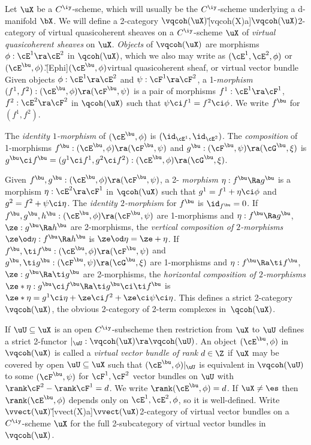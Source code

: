 \documentclass{article}
\begin{document}
\begin{dfn} Let $\uX$ be a $C^\iy$-scheme, which will
usually be the $C^\iy$-scheme underlying a d-manifold $\bX$. We will
define a 2-category
$\vqcoh(\uX)$\G[vqcoh(X)a]{$\vqcoh(\uX)$}{2-category of virtual
quasicoherent sheaves on a $C^\iy$-scheme $\uX$} of {\it virtual
quasicoherent sheaves\/} on $\uX$. {\it Objects\/} of $\vqcoh(\uX)$
are morphisms $\phi:\cE^1\ra\cE^2$ in $\qcoh(\uX)$, which we also
may write as $(\cE^1,\cE^2,\phi)$ or
$(\cE^\bu,\phi)$.\G[Ephi]{$(\cE^\bu,\phi)$}{virtual quasicoherent
sheaf, or virtual vector bundle} Given objects $\phi:\cE^1\ra\cE^2$
and $\psi:\cF^1\ra\cF^2$, a 1-{\it morphism\/}
$(f^1,f^2):(\cE^\bu,\phi)\ra(\cF^\bu,\psi)$ is a pair of morphisms
$f^1:\cE^1\ra\cF^1$, $f^2:\cE^2\ra\cF^2$ in $\qcoh(\uX)$ such that
$\psi\ci f^1=f^2\ci\phi$. We write $f^\bu$
for~$(f^1,f^2)$.

The {\it identity\/ $1$-morphism\/} of $(\cE^\bu,\phi)$ is
$(\id_{\cE^1},\id_{\cE^2})$. The {\it composition\/} of 1-morphisms
$f^\bu:(\cE^\bu,\phi)\ra(\cF^\bu,\psi)$ and
$g^\bu:(\cF^\bu,\psi)\ra(\cG^\bu,\xi)$ is $g^\bu\ci f^\bu=(g^1\ci
f^1,g^2\ci f^2):(\cE^\bu,\phi)\ra(\cG^\bu,\xi)$.

Given $f^\bu,g^\bu:(\cE^\bu,\phi)\ra(\cF^\bu,\psi)$, a 2-{\it
morphism\/} $\eta:f^\bu\Ra g^\bu$ is a morphism $\eta:\cE^2\ra\cF^1$
in $\qcoh(\uX)$ such that $g^1=f^1+\eta\ci\phi$ and
$g^2=f^2+\psi\ci\eta$. The {\it identity\/ $2$-morphism\/} for
$f^\bu$ is $\id_{f^\bu}=0$. If $f^\bu,g^\bu,h^\bu:(\cE^\bu,\phi)\ra
(\cF^\bu,\psi)$ are 1-morphisms and $\eta:f^\bu\Ra g^\bu$,
$\ze:g^\bu\Ra h^\bu$ are 2-morphisms, the {\it vertical composition
of\/ $2$-morphisms\/} $\ze\od\eta:f^\bu\Ra h^\bu$ is
$\ze\od\eta=\ze+\eta$. If $f^\bu,\ti
f{}^\bu:(\cE^\bu,\phi)\ra(\cF^\bu, \psi)$ and $g^\bu,\ti
g{}^\bu:(\cF^\bu,\psi)\ra(\cG^\bu,\xi)$ are 1-morphisms and
$\eta:f^\bu\Ra\ti f{}^\bu$, $\ze:g^\bu\Ra\ti g{}^\bu$ are
2-morphisms, the {\it horizontal composition of\/ $2$-morphisms\/}
$\ze*\eta:g^\bu\ci f^\bu\Ra\ti g{}^\bu\ci\ti f{}^\bu$ is
$\ze*\eta=g^1\ci\eta+\ze\ci f^2+\ze\ci\psi\ci\eta$. This defines a
strict 2-category $\vqcoh(\uX)$, the obvious 2-category of 2-term
complexes in~$\qcoh(\uX)$.

If $\uU\subseteq\uX$ is an open $C^\iy$-subscheme then restriction
from $\uX$ to $\uU$ defines a strict 2-functor
$\vert_\uU:\vqcoh(\uX)\ra\vqcoh(\uU)$. An object $(\cE^\bu,\phi)$ in
$\vqcoh(\uX)$ is called a {\it virtual vector bundle of rank\/}
$d\in\Z$ if $\uX$ may be covered by open $\uU\subseteq\uX$ such that
$(\cE^\bu,\phi)\vert_\uU$ is equivalent in $\vqcoh(\uU)$ to some
$(\cF^\bu,\psi)$ for $\cF^1,\cF^2$ vector bundles on $\uU$ with
$\rank\cF^2-\rank\cF^1=d$. We write $\rank(\cE^\bu,\phi)=d$. If
$\uX\ne\es$ then $\rank(\cE^\bu,\phi)$ depends only on
$\cE^1,\cE^2,\phi$, so it is well-defined. Write
$\vvect(\uX)$\G[vvect(X)a]{$\vvect(\uX)$}{2-category of virtual
vector bundles on a $C^\iy$-scheme $\uX$} for the full 2-subcategory
of virtual vector bundles in~$\vqcoh(\uX)$.


\end{dfn}
\end{document}
